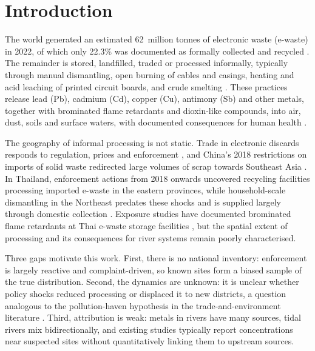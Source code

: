 \documentclass[10pt]{article}
\begin{document}
\section{Introduction}\label{sec:intro}
The world generated an estimated 62~million tonnes of electronic waste (e-waste) in 2022, of which only 22.3\% was documented as formally collected and recycled \citep{balde2024}. The remainder is stored, landfilled, traded or processed informally, typically through manual dismantling, open burning of cables and casings, heating and acid leaching of printed circuit boards, and crude smelting \citep{robinson2009,wong2007}. These practices release lead (Pb), cadmium (Cd), copper (Cu), antimony (Sb) and other metals, together with brominated flame retardants and dioxin-like compounds, into air, dust, soils and surface waters, with documented consequences for human health \citep{leung2008,grant2013}.

The geography of informal processing is not static. Trade in electronic discards responds to regulation, prices and enforcement \citep{lepawsky2015}, and China's 2018 restrictions on imports of solid waste redirected large volumes of scrap towards Southeast Asia \citep{brooks2018}. In Thailand, enforcement actions from 2018 onwards uncovered recycling facilities processing imported e-waste in the eastern provinces, while household-scale dismantling in the Northeast predates these shocks and is supplied largely through domestic collection \citep{puangprasert2019}. Exposure studies have documented brominated flame retardants at Thai e-waste storage facilities \citep{muenhor2010}, but the spatial extent of processing and its consequences for river systems remain poorly characterised.

Three gaps motivate this work. First, there is no national inventory: enforcement is largely reactive and complaint-driven, so known sites form a biased sample of the true distribution. Second, the dynamics are unknown: it is unclear whether policy shocks reduced processing or displaced it to new districts, a question analogous to the pollution-haven hypothesis in the trade-and-environment literature \citep{copeland2004}. Third, attribution is weak: metals in rivers have many sources, tidal rivers mix bidirectionally, and existing studies typically report concentrations near suspected sites without quantitatively linking them to upstream sources.
\end{document}
